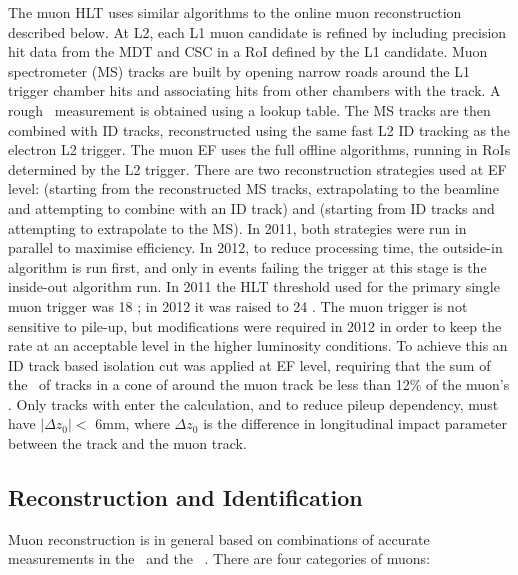 The muon HLT uses similar algorithms to the online muon reconstruction described
below. At L2, each L1 muon candidate is refined by including precision hit data
from the MDT and CSC in a RoI defined by the L1 candidate. Muon spectrometer
(MS) tracks are
built by opening narrow roads around the L1 trigger chamber hits and associating
hits from other chambers with the track. A rough \pt\ measurement is obtained
using a lookup table. The MS tracks are then combined with ID tracks,
reconstructed using the same fast L2 ID tracking as the electron L2 trigger.
The muon EF uses the full offline algorithms,
running in RoIs determined by the L2 trigger. There are two reconstruction
strategies used at EF level:  (starting from the reconstructed
MS tracks, extrapolating to the beamline and attempting to combine with an ID
track) and  (starting from ID tracks and attempting to
extrapolate to the MS). In 2011, both strategies were run in parallel to
maximise efficiency. In 2012, to reduce processing time, the outside-in
algorithm is run first, and only in events failing the trigger at this stage is
the inside-out algorithm run. In 2011 the HLT threshold used for the primary
single muon trigger was 18 \GeV; in 2012 it was raised to 24 \GeV. The muon
trigger is not sensitive to pile-up, but modifications were required in 2012 in
order to keep the rate at an acceptable level in the higher luminosity
conditions. To achieve this an ID track based isolation cut was applied at EF level,
requiring that the sum of the \pt\ of tracks in a cone of  around
the muon track be less than 12\% of the muon's \pt. Only tracks with 
enter the calculation, and to reduce pileup dependency, must have $|\Delta
z_{0}| <$ 6mm, where $\Delta z_{0}$ is the difference in longitudinal impact
parameter between the track and the muon track.

\subsection{Reconstruction and Identification}
\label{sec:reco-mu-reco}

Muon reconstruction is in general based on combinations of accurate measurements
in the \ms\ and the \id~\cite{ATLAS-CONF-2010-064,ATLAS-CONF-2011-063}. There are four categories of
muons:

